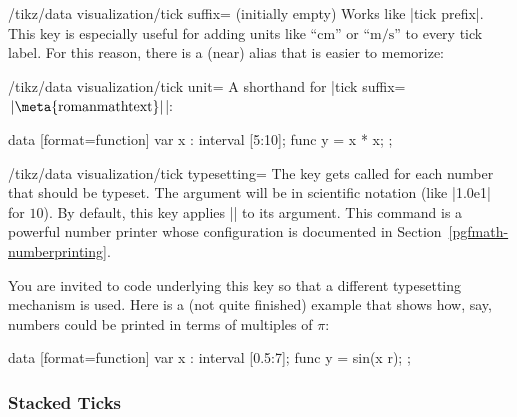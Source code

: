 \begin{key}{/tikz/data visualization/tick suffix=
    (initially \normalfont empty)}
  Works like |tick prefix|. This key is especially useful for adding
  units like ``cm'' or ``$\mathrm m/\mathrm s$'' to every tick
  label. For this reason, there is a (near) alias that is easier to memorize:
  \begin{key}{/tikz/data visualization/tick unit=}
    A shorthand for |tick suffix={$\,\rm|\meta{roman math text}|$}|:
\begin{codeexample}[]
\tikz \datavisualization
  [scientific axes, all axes={length=3cm},
   x axis={ticks={tick unit=s}},
   y axis={ticks={tick unit=m/s^2}},
   visualize as line]
  data [format=function] {
    var x : interval [5:10];
    func y = \value x * \value x;
  };
\end{codeexample}
  \end{key}
\end{key}

\begin{key}{/tikz/data visualization/tick typesetting=}
  The key gets called for each number that should be typeset. The
  argument  will be in scientific notation (like |1.0e1|
  for $10$). By default, this key applies |\pgfmathprintnumber| to its
  argument. This command is a powerful number printer whose
  configuration is documented in
  Section~\ref{pgfmath-numberprinting}. 

  You are invited to code underlying this key so that a different
  typesetting mechanism is used. Here is a (not quite finished)
  example that shows how, say, numbers could be printed in terms of
  multiples of $\pi$:
\begin{codeexample}[]
\def\mytypesetter#1{%
  \pgfmathparse{#1/pi}%
  \pgfmathprintnumber{\pgfmathresult}$\pi$%
}
\tikz \datavisualization
  [school book axes, all axes={unit length=1.25cm},
   x axis={ticks={step=(0.5*pi), tick typesetter/.code=\mytypesetter{##1}}},
   y axis={include value={-1,1}},
   visualize as smooth line]
  data [format=function] {
    var x : interval [0.5:7];
    func y = sin(\value x r);
  };
\end{codeexample}
\end{key}




\subsubsection{Stacked Ticks}

